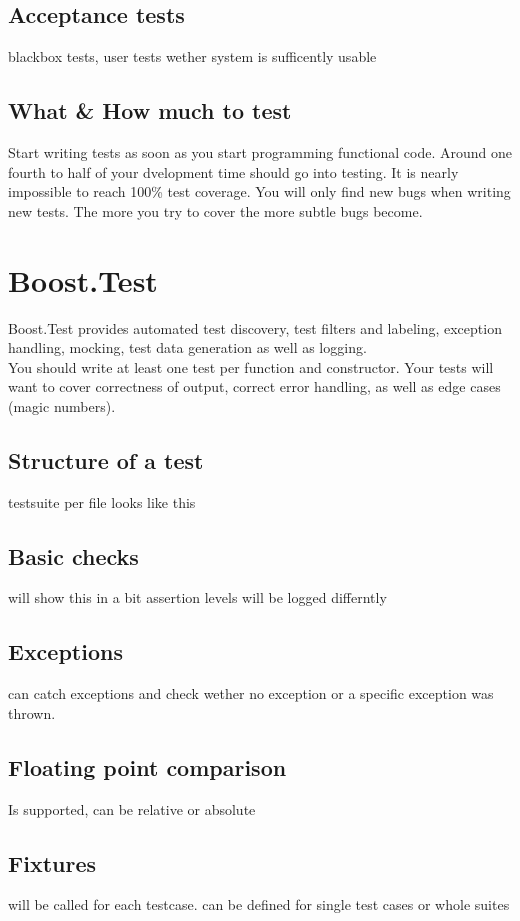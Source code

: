 \documentclass[a4paper]{scrbook}
\begin{document}
        \subsection{Acceptance tests}
        blackbox tests, user tests wether system is sufficently usable
        \subsection{What \& How much to test}
        Start writing tests as soon as you start programming functional code. Around one fourth to half of your dvelopment time should go into testing. It is nearly impossible to reach 100\% test coverage.
        You will only find new bugs when writing new tests. The more you try to cover the more subtle bugs become.
    \section{Boost.Test}
    Boost.Test provides automated test discovery, test filters and labeling, exception handling, mocking, test data generation as well as logging.\\
    You should write at least one test per function and constructor. Your tests will want to cover correctness of output, correct error handling, as well as edge cases (magic numbers).
        \subsection{Structure of a test}
        testsuite per file looks like this
        \subsection{Basic checks}
        will show this in a bit
        assertion levels will be logged differntly
        \subsection{Exceptions}
        can catch exceptions and check wether no exception or a specific exception was thrown.
        \subsection{Floating point comparison}
        Is supported, can be relative or absolute
        \subsection{Fixtures}
        will be called for each testcase. can be defined for single test cases or whole suites
\end{document}
